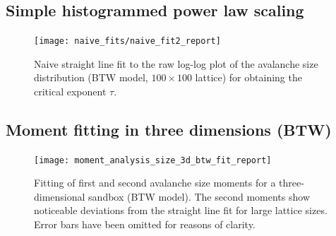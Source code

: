\appendix*

\section{}
\label{sec:app}

\subsection{Simple histogrammed power law scaling}
\label{app:naiveFit}
\begin{figure}[!h]
    \centering
    \texttt{[image: naive\_fits/naive\_fit2\_report]}
    \caption{Naive straight line fit to the raw log-log plot of the avalanche size distribution
             (BTW model, $100\times 100$ lattice) for obtaining the critical exponent $\tau$.}
    \label{fig:naiveFit}
\end{figure}

\subsection{Moment fitting in three dimensions (BTW)}
\label{app:btwSizeFit3D}
\begin{figure}[!h]
    \centering
    \texttt{[image: moment\_analysis\_size\_3d\_btw\_fit\_report]}
    \caption{Fitting of first and second avalanche size moments for a three-dimensional sandbox (BTW model).
             The second moments show noticeable deviations from the straight line fit for large lattice sizes.
             Error bars have been omitted for reasons of clarity.}
    \label{fig:btwSizeFit3D}
\end{figure}

